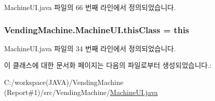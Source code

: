 Machine\+U\+I.\+java 파일의 66 번째 라인에서 정의되었습니다.

\subsubsection[{\texorpdfstring{this\+Class}{thisClass}}]{ Vending\+Machine.\+Machine\+U\+I.\+this\+Class = this\hspace{0.3cm}{\ttfamily [private]}}\hypertarget{class_vending_machine_1_1_machine_u_i_a0d705e137d12427a9af68595eb2be582}{}\label{class_vending_machine_1_1_machine_u_i_a0d705e137d12427a9af68595eb2be582}


Machine\+U\+I.\+java 파일의 34 번째 라인에서 정의되었습니다.



이 클래스에 대한 문서화 페이지는 다음의 파일로부터 생성되었습니다.\+:\begin{DoxyCompactItemize}
\item 
C\+:/workspace(\+J\+A\+V\+A)/\+Vending\+Machine (\+Report\#1)/src/\+Vending\+Machine/\hyperlink{_machine_u_i_8java}{Machine\+U\+I.\+java}\end{DoxyCompactItemize}
